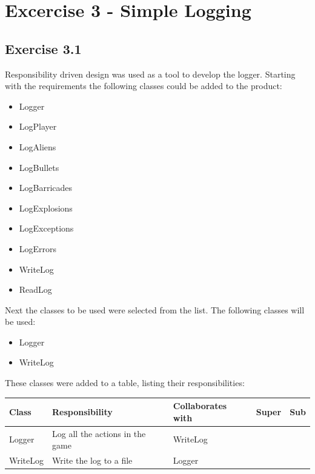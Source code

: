 \documentclass[10pt]{article}
\begin{document}
\pagebreak
\section*{Excercise 3 - Simple Logging}
\subsection*{Exercise 3.1}

Responsibility driven design was used as a tool to develop the logger.
Starting with the requirements the following classes could be added to the product:

\begin{itemize}
\item Logger
\item LogPlayer
\item LogAliens
\item LogBullets
\item LogBarricades
\item LogExplosions
\item LogExceptions
\item LogErrors
\item WriteLog
\item ReadLog
\end{itemize}

Next the classes to be used were selected from the list. The following classes will be used:
\begin{itemize}
\item Logger
\item WriteLog
\end{itemize}

These classes were added to a table, listing their responsibilities:
\begin{center}
   \hspace*{-0.75in}\begin{tabular}{ | p{3cm} | p{5cm} | p{3cm} | p{2cm} | p{2cm} |}
  \hline
  Class & Responsibility & Collaborates with & Super & Sub \\ \hline
  Logger & Log all the actions in the game & WriteLog & & \\ \hline
  WriteLog & Write the log to a file & Logger & & \\ \hline
    \end{tabular}
\end{center}
\end{document}

